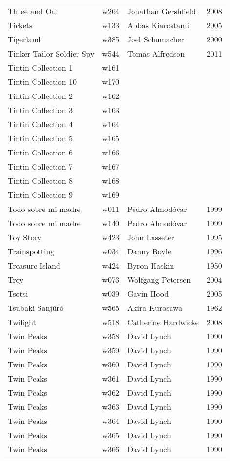 \documentclass{article}
\begin{document}
\begin {center}
\begin{longtable}{p{10cm} l l l}
Three and Out & w264 & Jonathan Gershfield & 2008 \\
Tickets & w133 & Abbas Kiarostami & 2005 \\
Tigerland & w385 & Joel Schumacher & 2000 \\
Tinker Tailor Soldier Spy & w544 & Tomas Alfredson & 2011 \\
Tintin Collection 1 & w161 &  &  \\
Tintin Collection 10 & w170 &  &  \\
Tintin Collection 2 & w162 &  &  \\
Tintin Collection 3 & w163 &  &  \\
Tintin Collection 4 & w164 &  &  \\
Tintin Collection 5 & w165 &  &  \\
Tintin Collection 6 & w166 &  &  \\
Tintin Collection 7 & w167 &  &  \\
Tintin Collection 8 & w168 &  &  \\
Tintin Collection 9 & w169 &  &  \\
Todo sobre mi madre & w011 & Pedro Almodóvar & 1999 \\
Todo sobre mi madre & w140 & Pedro Almodóvar & 1999 \\
Toy Story & w423 & John Lasseter & 1995 \\
Trainspotting & w034 & Danny Boyle & 1996 \\
Treasure Island & w424 & Byron Haskin & 1950 \\
Troy & w073 & Wolfgang Petersen & 2004 \\
Tsotsi & w039 & Gavin Hood & 2005 \\
Tsubaki Sanjûrô & w565 & Akira Kurosawa & 1962 \\
Twilight & w518 & Catherine Hardwicke & 2008 \\
Twin Peaks & w358 & David Lynch & 1990 \\
Twin Peaks & w359 & David Lynch & 1990 \\
Twin Peaks & w360 & David Lynch & 1990 \\
Twin Peaks & w361 & David Lynch & 1990 \\
Twin Peaks & w362 & David Lynch & 1990 \\
Twin Peaks & w363 & David Lynch & 1990 \\
Twin Peaks & w364 & David Lynch & 1990 \\
Twin Peaks & w365 & David Lynch & 1990 \\
Twin Peaks & w366 & David Lynch & 1990 \\

\end{longtable}
\end{center}
\end{document}
